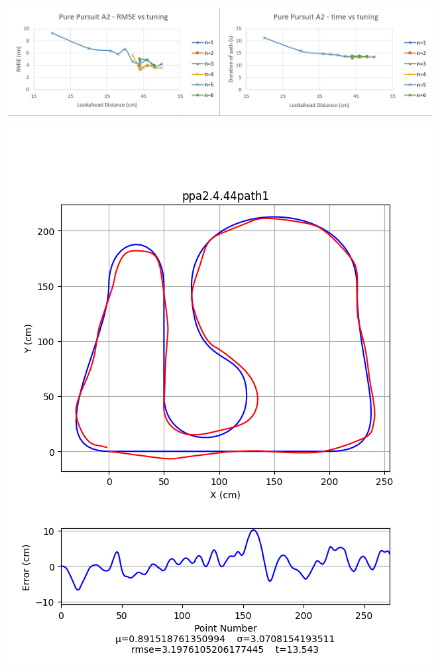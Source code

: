 \documentclass[12pt]{article}
\begin{document}
\begin{flushleft}
\begin{figure}[H]
\includegraphics[width=\linewidth]{images/tuningGraphs/ppa2}
\includegraphics[width=\linewidth]{images/pathData/ppa2path1}
\endminipage\hfill
{}

\end{figure}
\end{flushleft}
\end{document}
